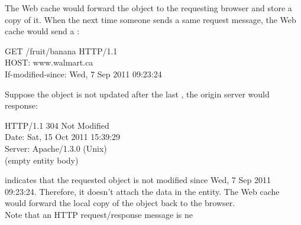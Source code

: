 The Web cache would forward the object to the requesting browser and store a copy of it.
When the next time someone sends a same request message, the Web cache would send a :

\begin{center}
    GET /fruit/banana HTTP/1.1\\
    HOST: www.walmart.ca\\
    If-modified-since: Wed, 7 Sep 2011 09:23:24
\end{center}

Suppose the object is not updated after the last , the origin server would response:

\begin{center}
    HTTP/1.1 304 Not Modified\\
    Date: Sat, 15 Oct 2011 15:39:29\\
    Server: Apache/1.3.0 (Unix)\\
    (empty entity body)
\end{center}

 indicates that the requested object is not modified since Wed, 7 Sep 2011 09:23:24.
Therefore, it doesn't attach the data in the entity. The Web cache would forward the local copy of the
object back to the browser.\\

Note that an HTTP request/response message is ne